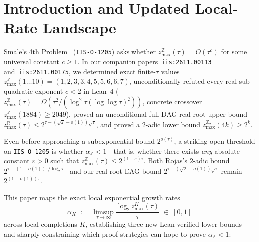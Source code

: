 \documentclass[11pt]{article}
\newcommand{\Z}{\mathbb{Z}}
\newcommand{\R}{\mathbb{R}}
\newcommand{\code}[1]{\texttt{#1}}
\newcommand{\zmax}{z_{\max}}
\begin{document}
\begin{abstract}
\begin{enumerate}[label=(\arabic*),leftmargin=1.8em]
\end{enumerate}
We also record an analytic $2$-adic obstruction study: under tropical nonsingularity and mod-$2$ $0$-dimensionality, a Quadratic Mod-$2$ Reduction Lemma and complete Nakayama over the Tate algebra $T_r^\circ$ yield a single-exponential bound $\frac{1}{6} 12^a$, but a Hensel Scale Dichotomy refutes generic perturbation and valued-extension deformation as ways to bypass mod-$2$ degeneracy. This work does \textbf{not} resolve $\zmax(\tau) \le 2^{(1-\varepsilon)\tau}$, the full Shub--Smale $\tau$-conjecture ($c \ge 2$), or $\mathrm{P}$ vs $\mathrm{NP}$; it was developed with AI assistance (Antigravity Harness + Gemini 4 Neon) and machine-verified in Lean~4.36.0.
\end{abstract}

\section{Introduction and Updated Local-Rate Landscape}

Smale's 4th Problem~\cite{ShubSmale1995} (\code{IIS-O-1205}) asks whether $\zmax^{\Z}(\tau) = O(\tau^c)$ for some universal constant $c \ge 1$. In our companion papers~\code{iis:2611.00113} and~\code{iis:2611.00175}, we determined exact finite-$\tau$ values $\zmax^{\Z}(1 \dots 10) = (1,2,3,3,4,5,5,6,6,7)$, unconditionally refuted every real sub-quadratic exponent $c < 2$ in Lean~4 ($\zmax^{\Z}(\tau) = \Omega(\tau^2/(\log^2 \tau (\log\log \tau)^2))$, concrete crossover $\zmax^{\Z}(1884) \ge 2049$), proved an unconditional full-DAG real-root upper bound $\zmax^{\R}(\tau) \le 2^{\tau - (\sqrt{2}-o(1))\sqrt{\tau}}$, and proved a $2$-adic lower bound $\zmax^{\Z_2}(4k) \ge 2^k$.

Even before approaching a subexponential bound $2^{o(\tau)}$, a striking open threshold on \code{IIS-O-1205} is whether $\alpha_{\Z} < 1$---that is, whether there exists \emph{any} absolute constant $\varepsilon > 0$ such that $\zmax^{\Z}(\tau) \le 2^{(1-\varepsilon)\tau}$. Both Rojas's $2$-adic bound $2^{\tau - (1-o(1))\tau/\log_2\tau}$~\cite{Rojas2002,Rojas2003} and our real-root DAG bound $2^{\tau - (\sqrt{2}-o(1))\sqrt{\tau}}$ remain $2^{(1-o(1))\tau}$.

This paper maps the exact local exponential growth rates
\[
  \alpha_K \;:=\; \limsup_{\tau \to \infty} \frac{\log_2 \zmax^K(\tau)}{\tau} \;\in\; [0, 1]
\]
across local completions $K$, establishing three new Lean-verified lower bounds and sharply constraining which proof strategies can hope to prove $\alpha_{\Z} < 1$:
\end{document}

